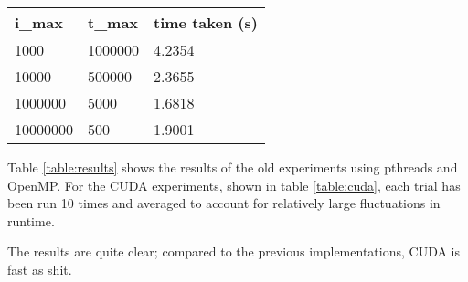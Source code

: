 \documentclass[a4paper]{article}
\begin{document}
\begin{table}[htbp]
    \centering
    \begin{tabular}{l|l|l}
        \hline
        i\_max & t\_max & time taken (s) \\
        \hline
        1000     & 1000000 & 4.2354 \\
        10000    & 500000  & 2.3655 \\
        1000000  & 5000    & 1.6818 \\
        10000000 & 500     & 1.9001 \\
        \hline
    \end{tabular}
\end{table}

Table \ref{table:results} shows the results of the old experiments using
pthreads and OpenMP.
For the CUDA experiments, shown in table \ref{table:cuda}, each trial has been
run 10 times and averaged to account for relatively large fluctuations in
runtime.

The results are quite clear; compared to the previous implementations, CUDA is
fast as shit.
\end{document}
